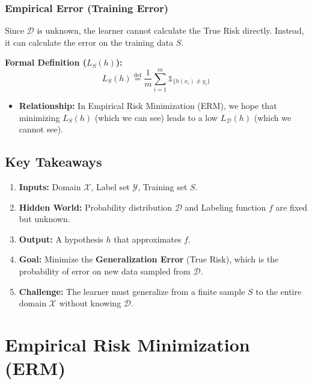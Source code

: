 \documentclass[
  italian,
  11pt,
]{article}
\providecommand{\tightlist}{%
  \setlength{\itemsep}{0pt}\setlength{\parskip}{0pt}}
\begin{document}
\subsubsection{Empirical Error (Training
Error)}\label{empirical-error-training-error}

Since \(\mathcal{D}\) is unknown, the learner cannot calculate the True
Risk directly. Instead, it can calculate the error on the training data
\(S\).

\textbf{Formal Definition (\(L_S(h)\)):}
\[ L_S(h) \overset{\text{def}}{=} \frac{1}{m} \sum_{i=1}^{m} \mathbb{1}_{\{h(x_i) \neq y_i\}} \]

\begin{itemize}
\tightlist
\item
  \textbf{Relationship:} In Empirical Risk Minimization (ERM), we hope
  that minimizing \(L_S(h)\) (which we can see) leads to a low
  \(L_{\mathcal{D}}(h)\) (which we cannot see).
\end{itemize}

\subsection{Key Takeaways}\label{key-takeaways}

\begin{enumerate}
\def\labelenumi{\arabic{enumi}.}
\tightlist
\item
  \textbf{Inputs:} Domain \(\mathcal{X}\), Label set \(\mathcal{Y}\),
  Training set \(S\).
\item
  \textbf{Hidden World:} Probability distribution \(\mathcal{D}\) and
  Labeling function \(f\) are fixed but unknown.
\item
  \textbf{Output:} A hypothesis \(h\) that approximates \(f\).
\item
  \textbf{Goal:} Minimize the \textbf{Generalization Error} (True Risk),
  which is the probability of error on new data sampled from
  \(\mathcal{D}\).
\item
  \textbf{Challenge:} The learner must generalize from a finite sample
  \(S\) to the entire domain \(\mathcal{X}\) without knowing
  \(\mathcal{D}\).
\end{enumerate}

\newpage

\section{Empirical Risk Minimization
(ERM)}\label{empirical-risk-minimization-erm}
\end{document}
